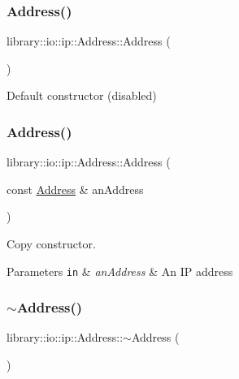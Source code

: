 \subsubsection{\texorpdfstring{Address()}{Address()}\hspace{0.1cm}{\footnotesize\ttfamily [1/2]}}
{\footnotesize\ttfamily library\+::io\+::ip\+::\+Address\+::\+Address (\begin{DoxyParamCaption}{ }\end{DoxyParamCaption})\hspace{0.3cm}{\ttfamily [delete]}}



Default constructor (disabled) 

\mbox{\label{classlibrary_1_1io_1_1ip_1_1_address_a222cb11723f00e1949560cd6cb6586d0}} 
\subsubsection{\texorpdfstring{Address()}{Address()}\hspace{0.1cm}{\footnotesize\ttfamily [2/2]}}
{\footnotesize\ttfamily library\+::io\+::ip\+::\+Address\+::\+Address (\begin{DoxyParamCaption}\item[{const \hyperlink{classlibrary_1_1io_1_1ip_1_1_address}{Address} \&}]{an\+Address }\end{DoxyParamCaption})}



Copy constructor. 


\begin{DoxyParams}[1]{Parameters}
\mbox{\tt in}  & {\em an\+Address} & An IP address \\
\hline
\end{DoxyParams}
\mbox{\label{classlibrary_1_1io_1_1ip_1_1_address_a430e600e721374368c5bbc0a6351e094}} 
\subsubsection{\texorpdfstring{$\sim$\+Address()}{~Address()}}
{\footnotesize\ttfamily library\+::io\+::ip\+::\+Address\+::$\sim$\+Address (\begin{DoxyParamCaption}{ }\end{DoxyParamCaption})}



